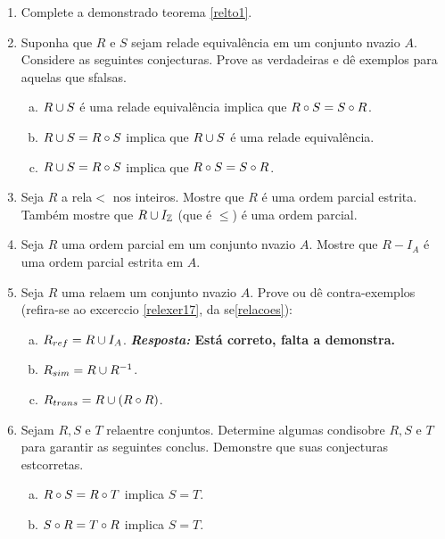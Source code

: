 \begin{enumerate}[{\bf 1.}]
\begin{enumerate}[a)]
\item $Im(R)\subseteq Dom(S)$ implica $Dom(S\bola R)=Dom(R)$. A rec\ih proca \'e verdadeira? 
\end{enumerate}

\item Complete a demonstra\cao do teorema \ref{relto1}.

\item Suponha que $R$ e $S$ sejam rela\coes de equival\^encia em um conjunto n\ao vazio $A$. Considere as seguintes conjecturas. Prove as verdadeiras e d\^e exemplos para aquelas que s\ao falsas. 
\begin{enumerate}[a)]
\item $R\cup S$ \'e uma rela\cao de equival\^encia implica que $R\circ S=S\circ R$.
\item $R\cup S= R\circ S$ implica que $R\cup S$ \'e uma rela\cao de equival\^encia.
\item $R\cup S= R\circ S$ implica que $R\circ S=S\circ R$.
\end{enumerate}

\item Seja $R$ a rela\cao $<$ nos inteiros. Mostre que $R$ \'e uma ordem parcial estrita. Tamb\'em mostre que $R\cup I_{\mathbb{Z}}$ (que \'e $\leq$) \'e uma ordem parcial.

\item Seja $R$ uma ordem parcial em um conjunto n\ao vazio $A$. Mostre que $R-I_A$ \'e uma ordem parcial estrita em $A$.

\item Seja $R$ uma rela\cao em um conjunto n\ao vazio $A$. Prove ou d\^e contra-exemplos (refira-se ao excerc\ih cio \ref{relexer17}, da se\cao \ref{relacoes}):
\begin{enumerate}[a)]
\item $R_{ref}=R\cup I_A$. {\bf{\it Resposta:} Est\'a correto, falta a demonstra\caoi.}
\item $R_{sim}=R\cup R^{-1}$.
\item $R_{trans}=R\cup (R\circ R)$.
\end{enumerate}

\item Sejam $R,S$ e $T$ rela\coes entre conjuntos. Determine algumas condi\coes sobre $R,S$ e $T$ para garantir as seguintes conclus\ois. Demonstre que suas conjecturas est\ao corretas.
\begin{enumerate}[a)]
\item $R\circ S=R\circ T$ implica $S=T$.
\item $S\circ R=T\circ R$ implica $S=T$.
\end{enumerate}


\end{enumerate}
